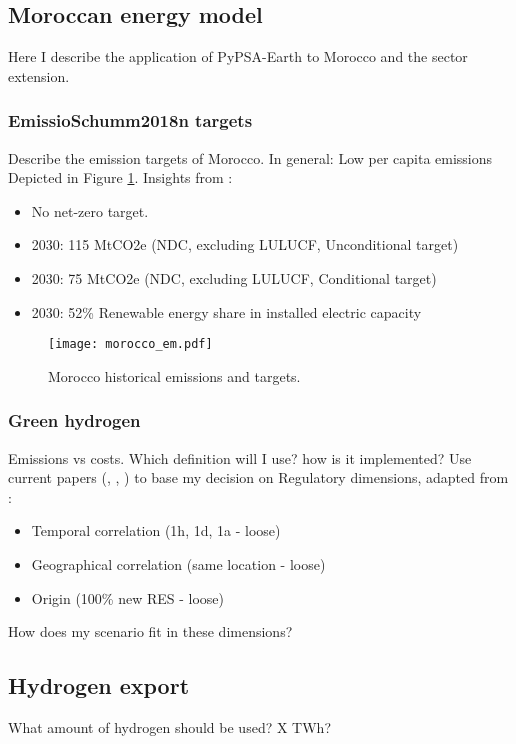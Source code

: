 
\subsection{Moroccan energy model}
Here I describe the application of PyPSA-Earth \cite{Parzen2022} to Morocco and the sector extension.
\subsubsection{EmissioSchumm2018n targets}
Describe the emission targets of Morocco. In general: Low per capita emissions
Depicted in Figure \ref{fig:morocco_em}.
Insights from \cite{CAT2021}:
\begin{itemize}
    \item No net-zero target.
    \item 2030: 115 MtCO2e (NDC, excluding LULUCF, Unconditional target)
    \item 2030: 75 MtCO2e (NDC, excluding LULUCF, Conditional target)
    \item 2030: 52\% Renewable energy share in installed electric capacity
\end{itemize}



\begin{figure}[h!]
    \centering
    \texttt{[image: morocco\_em.pdf]}
    \caption{Morocco historical emissions and targets.}
    \label{fig:morocco_em}
\end{figure}




\subsubsection{Green hydrogen}
Emissions vs costs. Which definition will I use? how is it implemented?
Use current papers (\cite{Brauer2022}, \cite{Ruhnau2022}, \cite{Zeyen2022a}) to base my decision on
Regulatory dimensions, adapted from \cite{Brauer2022}:
\begin{itemize}
    \item Temporal correlation (1h, 1d, 1a - loose) 
    \item Geographical correlation (same location - loose)
    \item Origin (100\% new RES - loose)
\end{itemize}
How does my scenario fit in these dimensions?
\subsection{Hydrogen export}
What amount of hydrogen should be used? X TWh?
